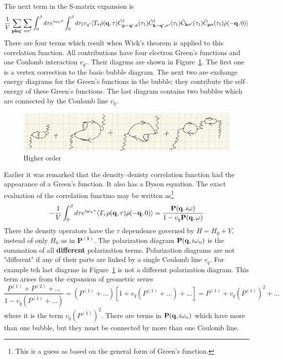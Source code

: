 The next term in the S-matrix expansion is
\begin{equation}
    \frac{1}{V} \sum_{\mathbf{p}\mathbf{k}\mathbf{q}'} \sum_{\sigma\sigma'} \int_0^\beta d\tau e^{i\omega_n \tau} \int_0^\beta d\tau_1 v_{q'} \langle T_\tau \hat{\rho}(\mathbf{q},\tau) \hat{C}^\dagger_{\mathbf{p}+\mathbf{q}',\sigma}(\tau_1) \hat{C}^\dagger_{\mathbf{k}-\mathbf{q}',\sigma'}(\tau_1) \hat{C}_{\mathbf{k}\sigma'}(\tau_1) \hat{C}_{\mathbf{p}\sigma}(\tau_1) \hat{\rho}(-\mathbf{q},0) \rangle   \label{5.158}
\end{equation}
There are four terms which result when Wick's theorem is applied to this correlation function.
All contributions have four electron Green's functions and one Coulomb interaction $v_{q'}$. Their diagrms are shown in Figure~\ref{fig:5.10}.
The first one is a vertex correction to the basic bubble diagram.
The next two are exchange energy diagrams for the Green's functions in the bubble;
they contribute the self--energy of these Green's functions.
The last diagram contains two bubbles which are connected by the Coulomb line $v_q$.
\begin{figure}[ht]
    \centering
    \includegraphics[width=0.8\linewidth]{fig/fig5-10.png}
    \caption{Higher order}%
    \label{fig:5.10}
\end{figure}

Earlier it was remarked that the density--denisty correlation function had the appearance of a Green's function.
It also has a Dyson equation.
The exact evaluation of the correlation functino may be written as\footnote{This is a guess as based on the general form of Green's function.}
\begin{equation}
    - \frac{1}{V} \int_0^\beta d \tau e^{i\omega_n \tau} \langle T_\tau \rho(\mathbf{q},\tau) \rho(-\mathbf{q},0) \rangle = \frac{\mathbf{P}(\mathbf{q},i\omega)}{1 - v_q \mathbf{P}(\mathbf{q},\omega)}   \label{5.159}
\end{equation}
There the density operators have the $\tau$ dependence governed by $H=H_0 + V$, instead of only $H_0$ as in $\mathbf{P^{(1)}}$.
The polarization diagram $\mathbf{P}(\mathbf{q},i\omega_n)$ is the summation of all \textbf{different} polarization terms.
Polarization diagrams are not "different" if any of their parts are linked by a single Coulomb line $v_q$.
For example teh last diagrme in Figure~\ref{fig:5.10} is not a different polarization diagram.
This term arises from the expansion of geometric series
\begin{equation}
    \frac{P^{(1)}+P^{(2)} + \dots}{1 - v_q \left(P^{(1)} + \dots \right)} = \left( P^{(1)} + \dots \right) \left[ 1 + v_q \left( P^{(1)} + \dots \right) + \dots \right] = P^{(1)} + v_q \left( P^{(1)} \right)^2  + \dots \label{5.160}
\end{equation}
where it is the term $v_q\left( P^{(1)}\right)^2$.
There are terms in $\mathbf{P}(\mathbf{q},i\omega_n)$ which have more than one bubble, but they must be connected by more than one Coulomb line.

